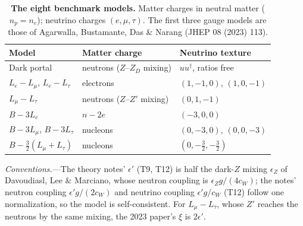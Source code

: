 \documentclass[11pt,a4paper]{article}
\newcommand{\epsp}{\epsilon'}
\begin{document}
\begin{table}[h]
\centering
\caption{\textbf{The eight benchmark models.} Matter charges in neutral matter ($n_p = n_e$);
neutrino charges $(e,\mu,\tau)$. The first three gauge models are those of
Agarwalla, Bustamante, Das \& Narang (JHEP 08 (2023) 113).}
\label{tab:benchmarks}
\footnotesize
\begin{tabular}{lll}
\toprule
Model & Matter charge & Neutrino texture \\
\midrule
Dark portal & neutrons ($Z$--$Z_D$ mixing) & $uu^\dagger$, ratios free \\
$L_e-L_\mu$, $L_e-L_\tau$ & electrons & $(1,-1,0)$, $(1,0,-1)$ \\
$L_\mu-L_\tau$ & neutrons ($Z$--$Z'$ mixing) & $(0,1,-1)$ \\
$B-3L_e$ & $n - 2e$ & $(-3,0,0)$ \\
$B-3L_\mu$, $B-3L_\tau$ & nucleons & $(0,-3,0)$, $(0,0,-3)$ \\
$B-\frac{3}{2}(L_\mu+L_\tau)$ & nucleons & $(0,-\frac{3}{2},-\frac{3}{2})$ \\
\bottomrule
\end{tabular}
\end{table}

\textit{Conventions.}---The theory notes' $\epsp$ (T9, T12) is half the dark-$Z$ mixing $\epsilon_Z$ of
Davoudiasl, Lee \& Marciano, whose neutron coupling is $\epsilon_Z g/(4c_W)$; the notes' neutron coupling
$\epsp g/(2c_W)$ and neutrino coupling $\epsp g/c_W$ (T12) follow one normalization, so the model is
self-consistent. For $L_\mu-L_\tau$, whose $Z'$ reaches the neutrons by the same mixing, the 2023 paper's
$\xi$ is $2\epsp$.
\end{document}
